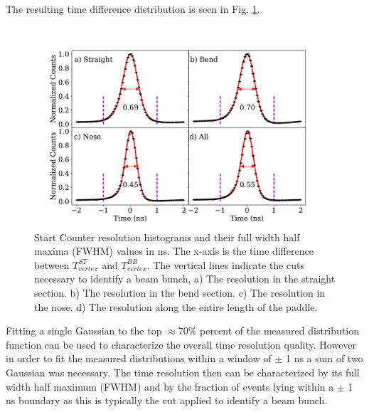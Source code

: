 The resulting time difference distribution is seen in Fig. \ref{fig:st_time_res}.
	\begin{figure}[!htb]
		\centering
		\includegraphics[width=1.08\linewidth]{performance/figs/TR_2gaussian}
		\caption{Start Counter  resolution  histograms and their full width half maxima (FWHM) values in ns.  The x-axis is the time difference between $T^{ST}_{vertex}$ and $T^{BB}_{vertex}$. The vertical lines indicate the cuts necessary to identify a beam bunch, a) The resolution in the straight section. b) The resolution in the bend section. c) The resolution in the nose. d) The resolution along the entire length of the paddle. }
		\label{fig:st_time_res}
	\end{figure}
Fitting a single Gaussian to the top $\approx 70\%$ percent of the measured distribution function can be used to characterize the overall time resolution quality. However in order to fit the measured distributions within a window of $\pm$ 1 ns a sum of two Gaussian was necessary. The time resolution then can be characterized by its full width half maximum (FWHM) and by the fraction of events lying within a $\pm$ 1 ns boundary as this is typically the cut applied to identify a beam bunch.  

